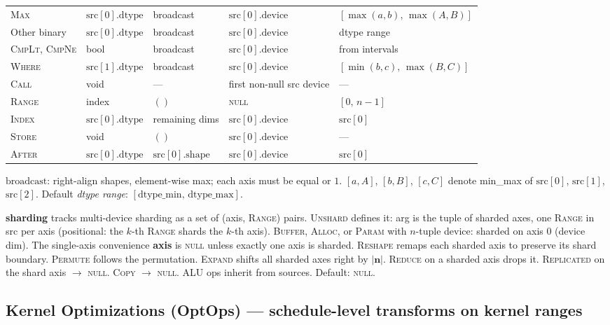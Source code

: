 \documentclass[10pt,letterpaper]{article}
\newcommand{\op}[1]{\textsc{#1}}
\begin{document}
\begin{tabular}{@{}l l l l l@{}}
\op{Max} & $\mathrm{src}[0].\mathrm{dtype}$ & broadcast & $\mathrm{src}[0].\mathrm{device}$ & $[\max(a,b),\, \max(A,B)]$ \\
Other binary & $\mathrm{src}[0].\mathrm{dtype}$ & broadcast & $\mathrm{src}[0].\mathrm{device}$ & dtype range \\
\op{CmpLt}, \op{CmpNe} & bool & broadcast & $\mathrm{src}[0].\mathrm{device}$ & from intervals \\
\op{Where} & $\mathrm{src}[1].\mathrm{dtype}$ & broadcast & $\mathrm{src}[0].\mathrm{device}$ & $[\min(b,c),\, \max(B,C)]$ \\[3pt]
\op{Call} & void & --- & first non-null src device & --- \\
\op{Range} & index & $()$ & \textsc{null} & $[0,\, n{-}1]$ \\
\op{Index} & $\mathrm{src}[0].\mathrm{dtype}$ & remaining dims & $\mathrm{src}[0].\mathrm{device}$ & $\mathrm{src}[0]$ \\
\op{Store} & void & $()$ & $\mathrm{src}[0].\mathrm{device}$ & --- \\
\op{After} & $\mathrm{src}[0].\mathrm{dtype}$ & $\mathrm{src}[0].\mathrm{shape}$ & $\mathrm{src}[0].\mathrm{device}$ & $\mathrm{src}[0]$ \\
\bottomrule
\end{tabular}

\smallskip
$\mathrm{broadcast}$: right-align shapes, element-wise max; each axis must be equal or $1$.
$[a,A]$, $[b,B]$, $[c,C]$ denote min\_max of $\mathrm{src}[0]$, $\mathrm{src}[1]$, $\mathrm{src}[2]$.
Default \emph{dtype range}: $[\mathrm{dtype\_min},\, \mathrm{dtype\_max}]$.

\medskip
\textbf{sharding} tracks multi-device sharding as a set of (axis, \op{Range}) pairs. \op{Unshard} defines it: arg is the tuple of sharded axes, one \op{Range} in src per axis (positional: the $k$-th \op{Range} shards the $k$-th axis). \op{Buffer}, \op{Alloc}, or \op{Param} with $n$-tuple device: sharded on axis $0$ (device dim). The single-axis convenience \textbf{axis} is \textsc{null} unless exactly one axis is sharded.
\op{Reshape} remaps each sharded axis to preserve its shard boundary. \op{Permute} follows the permutation. \op{Expand} shifts all sharded axes right by $|\mathbf{n}|$.
\op{Reduce} on a sharded axis drops it. \op{Replicated} on the shard axis $\to$ \textsc{null}. \op{Copy} $\to$ \textsc{null}. ALU ops inherit from sources. Default: \textsc{null}.

\subsection*{Kernel Optimizations (OptOps) \normalfont\small--- schedule-level transforms on kernel ranges}
\end{document}
